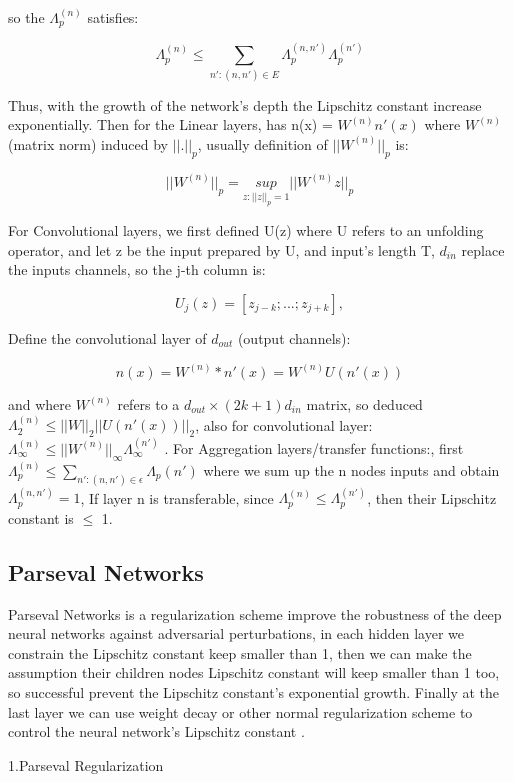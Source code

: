 so the $\Lambda_p^{(n)}$ satisfies:

$$\Lambda_p^{(n)} \leq \sum_{n':(n,n')\in E} \Lambda_p^{(n,n')} \Lambda_p^{(n')}$$

Thus, with the growth of the network's depth the Lipschitz constant increase exponentially. Then for the Linear layers, has n(x) = $W^{(n)}n'(x)$ where $W^{(n)}$ (matrix norm) induced by $||.||_p$, usually definition of $||W^{(n)}||_p$ is:  

$$||W^{(n)}||_p = \underset{z:||z||_p = 1}{sup} ||W^{(n)}z||_p$$

For Convolutional layers, we first defined U(z) where U refers to an unfolding operator, and let z be the input prepared by U, and input's length T, $d_{in}$ replace the inputs channels, so the j-th column is:

$$U_j(z) = [z_{j-k};...;z_{j + k}],$$

Define the convolutional layer of  $d_{out}$ (output channels):

$$n(x) = W^{(n)} * n'(x) = W^{(n)}U(n'(x))$$

and where $W^{(n)}$ refers to a $d_{out} \times(2k+1)d_{in}$ matrix, so deduced $\Lambda_2^{(n)} \leq ||W||_2||U(n'(x))||_2$, also for convolutional layer: $\Lambda_{\infty}^{(n)} \leq ||W^{(n)}||_{\infty} \Lambda_{\infty}^{(n')}$ . For Aggregation layers/transfer functions:, first $\Lambda_p^{(n)} \leq \sum_{n':(n,n')\in \epsilon} \Lambda_p{(n')}$ where we sum up the n nodes inputs and obtain $\Lambda_p^{(n,n')} = 1$, If layer n is transferable, since $\Lambda_p^{(n)} \leq \Lambda_p^{(n')}$, then their Lipschitz constant is $\leq$ 1.

\subsection{Parseval Networks}

Parseval Networks is a regularization scheme improve the robustness of the deep neural networks against adversarial perturbations, in each hidden layer we constrain the Lipschitz constant keep smaller than 1, then we can make the assumption their children nodes Lipschitz constant will keep smaller than 1 too, so successful prevent the Lipschitz constant's exponential growth. Finally at the last layer we can use weight decay or other normal regularization scheme to control the neural network's Lipschitz constant \cite{cisse2017parseval}.

1.Parseval Regularization

